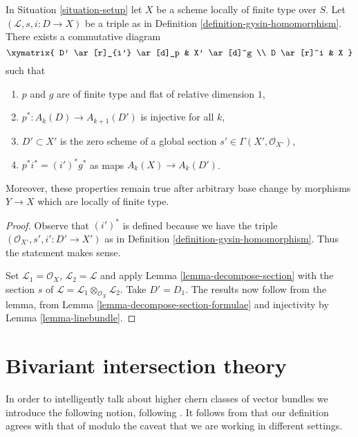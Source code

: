 \begin{lemma}
\label{lemma-normal-cone-effective-Cartier}
In Situation \ref{situation-setup} let $X$ be a scheme locally
of finite type over $S$. Let $(\mathcal{L}, s, i : D \to X)$
be a triple as in Definition \ref{definition-gysin-homomorphism}.
There exists a commutative diagram
$$
\xymatrix{
D' \ar[r]_{i'} \ar[d]_p & X' \ar[d]^g \\
D \ar[r]^i & X
}
$$
such that
\begin{enumerate}
\item $p$ and $g$ are of finite type and flat of relative dimension $1$,
\item $p^* : A_k(D) \to A_{k + 1}(D')$ is injective for all $k$,
\item $D' \subset X'$ is the zero scheme of a global section
$s' \in \Gamma(X', \mathcal{O}_{X'})$,
\item $p^*i^* = (i')^*g^*$ as maps $A_k(X) \to A_k(D')$.
\end{enumerate}
Moreover, these properties remain true after arbitrary base change
by morphisms $Y \to X$ which are locally of finite type.
\end{lemma}

\begin{proof}
Observe that $(i')^*$ is defined because we have the triple
$(\mathcal{O}_{X'}, s', i' : D' \to X')$ as in
Definition \ref{definition-gysin-homomorphism}. Thus the statement makes sense.

\medskip\noindent
Set $\mathcal{L}_1 = \mathcal{O}_X$, $\mathcal{L}_2 = \mathcal{L}$
and apply Lemma \ref{lemma-decompose-section} with the section $s$ of
$\mathcal{L} = \mathcal{L}_1 \otimes_{\mathcal{O}_X} \mathcal{L}_2$.
Take $D' = D_1$. The results now follow from the lemma, from
Lemma \ref{lemma-decompose-section-formulae}
and injectivity by
Lemma \ref{lemma-linebundle}.
\end{proof}











\section{Bivariant intersection theory}
\label{section-bivariant}

\noindent
In order to intelligently talk about higher chern classes of vector
bundles we introduce the following notion, following \cite{FM}.
It follows from \cite[Theorem 17.1]{F} that our definition agrees
with that of \cite{F} modulo the caveat that we are working in different
settings.

